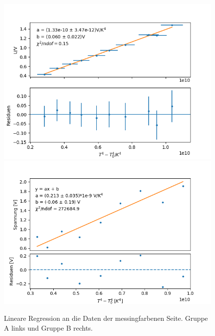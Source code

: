 \documentclass[12pt,a4paper]{article}
\begin{document}
\begin{figure}[H]
\centering
\includegraphics[scale=0.5]{Bilder/Messing_A}
\includegraphics[scale=0.5]{Bilder/messing_B}
\caption{Lineare Regression an die Daten der messingfarbenen Seite. Gruppe A links und Gruppe B rechts.}
\label{fig:RegMessing}
\end{figure}
\end{document}
